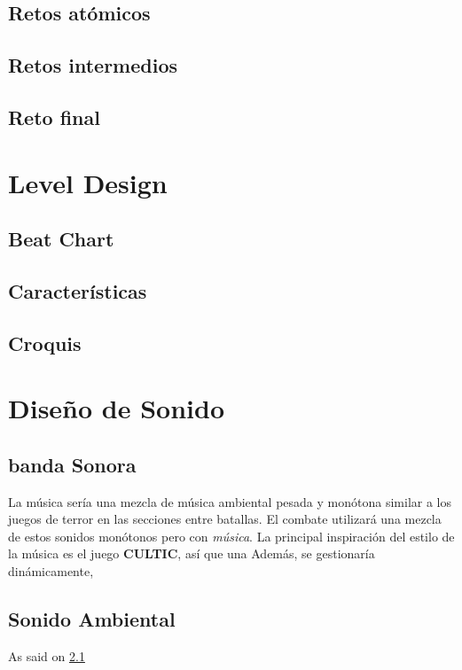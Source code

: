     \subsection{Retos atómicos}
    \subsection{Retos intermedios }
    \subsection{Reto final}

\section{Level Design} \label{levelDesign}
    \subsection{Beat Chart}
    \subsection{Características}

    \subsection{Croquis}

\section{Diseño de Sonido}
    \subsection{banda Sonora} \label{ost}
        La música sería una mezcla de música ambiental pesada y monótona similar a los juegos de terror en las secciones entre batallas. El combate utilizará una mezcla de estos sonidos monótonos pero con \textit{música}.
        La principal inspiración del estilo de la música es el juego \textbf{CULTIC}, así que una
        Además, se gestionaría dinámicamente,

    \subsection{Sonido Ambiental}
        As said on \ref{ost}
